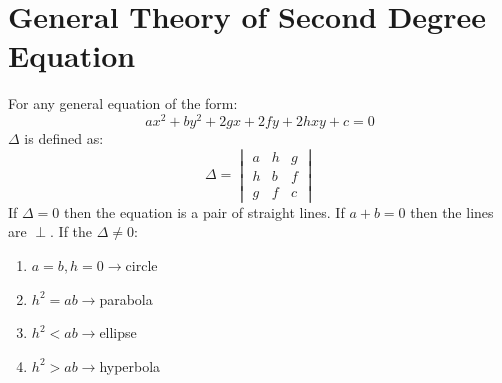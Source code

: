 \large{\chapter{General Theory of Second Degree Equation}}
For any general equation of the form:
\begin{equation}
	ax^2+by^2+2gx+2fy+2hxy+c=0
\end{equation}
$\Delta$ is defined as:
\begin{equation}
	\Delta=\begin{vmatrix}
		a&h&g\\
		h&b&f\\
		g&f&c
	\end{vmatrix}
\end{equation}
If $\Delta=0$ then the equation is a pair of straight lines. If $a+b=0$ then the lines are $\perp$.\newline
If the $\Delta \neq 0$:
\begin{enumerate}
	\item $a=b, h=0\rightarrow$circle
	\item $h^2=ab\rightarrow$parabola
	\item $h^2<ab\rightarrow$ellipse
	\item $h^2>ab\rightarrow$hyperbola
\end{enumerate}
